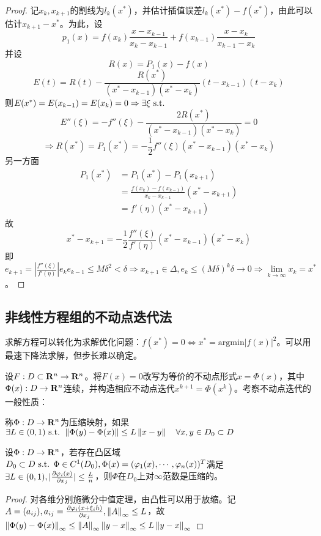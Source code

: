 \documentclass{ctexart}
\begin{document}
\begin{proof}
记$x_k,x_{k+1}$的割线为$l_k(x^*)$，并估计插值误差$l_k(x^*)-f(x^*)$，由此可以估计$x_{k+1}-x^*$。为此，设
\[p_1(x)=f(x_k)\frac{x-x_{k-1}}{x_k-x_{k-1}}+f(x_{k-1})\frac{x-x_k}{x_{k-1}-x_k}\]
并设
\[R(x)=P_1(x)-f(x)\]\[E(t)=R(t)-\frac{R(x^*)}{(x^*-x_{k-1})(x^*-x_k)}(t-x_{k-1})(t-x_k)\]则$E(x^*)=E(x_{k-1})=E(x_k)=0\Rightarrow \exists\xi\text{ s.t. } $
\[E''(\xi)=-f''(\xi)-\frac{2R(x^*)}{(x^*-x_{k-1})(x^*-x_k)}=0\]
\[\Rightarrow R(x^*)=P_1(x^*)=-\frac{1}{2}f''(\xi)(x^*-x_{k-1})(x^*-x_k)\]
另一方面
\begin{align*}
P_1(x^*)&=P_1(x^*)-P_1(x_{k+1})\\
&=\frac{f(x_k)-f(x_{k-1})}{x_k-x_{k-1}}(x^*-x_{k+1})\\
&=f'(\eta)(x^*-x_{k+1})
\end{align*}
故
\[x^*-x_{k+1}=-\frac{1}{2}\frac{f''(\xi)}{f'(\eta)}(x^*-x_{k-1})(x^*-x_k)\]
即$e_{k+1}=|\frac{f''(\xi)}{f'(\eta)}|e_ke_{k-1}\leq M\delta^2<\delta\Rightarrow x_{k+1}\in\Delta,e_k\leq (M\delta)^k\delta\to 0\Rightarrow \lim\limits_{k\to\infty}x_k=x^*$。
\end{proof}

\subsection{非线性方程组的不动点迭代法}
求解方程可以转化为求解优化问题：$f(x^*)=0\Leftrightarrow x^*=\mathrm{argmin}|f(x)|^2$。可以用最速下降法求解，但步长难以确定。

设$F:D\subset \mathbf{R}^n\to\mathbf{R}^n$。将$F(x)=0$改写为等价的不动点形式$x=\Phi(x)$，其中$\Phi(x):D\to \mathbf{R}^n$连续，并构造相应不动点迭代$x^{k+1}=\Phi(x^k)$。考察不动点迭代的一般性质：
\begin{Def}
称$\Phi:D\to\mathbf{R}^n$为压缩映射，如果$\exists L\in (0,1)\text{ s.t. }\left\|\Phi(y)-\Phi(x) \right\|\leq L\left\|x-y \right\|\quad\forall x,y\in D_0\subset D$
\end{Def}

\begin{Thm}
设$\Phi:D\to\mathbf{R}^n$，若存在凸区域$D_0\subset D\text{ s.t. } \Phi\in C^1(D_0),\Phi(x)=(\varphi_1(x),\cdots, \varphi_n(x))^T$满足$\exists L\in (0,1),|\frac{\partial \varphi_i(x)}{\partial x_j}|\leq \frac{L}{n}$，则$\Phi$在$D_0$上对$\infty$范数是压缩的。
\end{Thm}
\begin{proof}
对各维分别施微分中值定理，由凸性可以用于放缩。记$A=(a_{ij}),a_{ij}=\frac{\partial \varphi_i(x+\xi_i h)}{\partial x_j},\left\|A \right\|_\infty\leq L$，故$\left\|\Phi(y)-\Phi(x) \right\|_\infty\leq \left\|A \right\|_\infty\left\|y-x \right\|_\infty\leq L\left\|y-x \right\|_\infty$
\end{proof}
\end{document}
